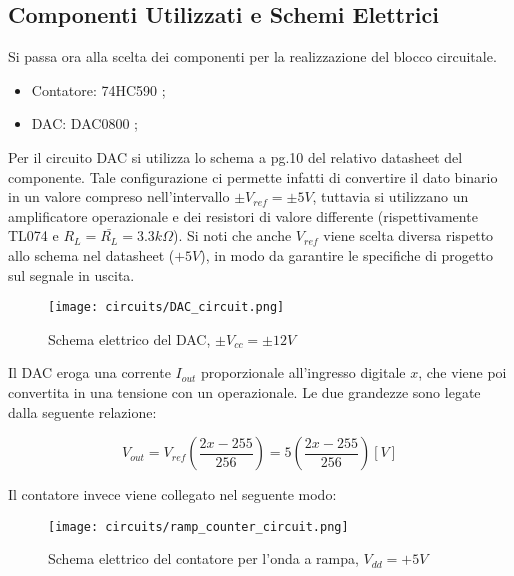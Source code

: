 \subsection*{Componenti Utilizzati e Schemi Elettrici}


Si passa ora alla scelta dei componenti per la realizzazione del blocco circuitale.

\begin{itemize}
    \item Contatore: 74HC590 \cite{74hc590};
    \item DAC: DAC0800 \cite{dac0800};
\end{itemize}

Per il circuito DAC si utilizza lo schema a pg.10 del relativo datasheet del componente.
Tale configurazione ci permette infatti di convertire il dato binario in un valore compreso
nell'intervallo $\pm V_{ref}= \pm 5V$, tuttavia si utilizzano un amplificatore
operazionale e dei resistori di valore differente (rispettivamente TL074 \cite{tl074} e
$R_L=\bar{R_L}=3.3k\Omega$). Si noti che anche $V_{ref}$ viene scelta diversa rispetto allo
schema nel datasheet ($+5V$), in modo da garantire le specifiche di progetto sul segnale
in uscita.
\medskip

\begin{figure}[ht]
    \centering
    \texttt{[image: circuits/DAC\_circuit.png]}
    \caption{Schema elettrico del DAC, $\pm V_{cc}=\pm 12V$}
    \label{DAC_circuit}
\end{figure}

Il DAC eroga una corrente $I_{out}$ proporzionale all'ingresso digitale $x$, che viene poi
convertita in una tensione con un operazionale. Le due grandezze sono legate dalla seguente
relazione:

\begin{displaymath}
    V_{out}=V_{ref}\left(\frac{2x-255}{256}\right)=5\left(\frac{2x-255}{256}\right)[V]
\end{displaymath}

Il contatore invece viene collegato nel seguente modo:
\medskip

\begin{figure}[ht]
    \centering
    \texttt{[image: circuits/ramp\_counter\_circuit.png]}
    \caption{Schema elettrico del contatore per l'onda a rampa, $V_{dd}=+5V$}
    \label{ramp_counter_circuit}
\end{figure}


